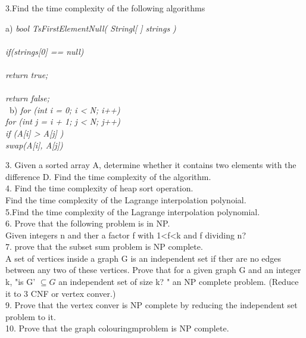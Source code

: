 \documentclass[a4paper]{article}
\begin{document}
\vspace{3mm}
\begin{flushleft}
3.Find the time complexity of the following algorithms\\
\end{flushleft}
a){ \em bool TsFirstElementNull( Stringl[ ]  strings )\\
{\\
if(strings[0] == null)\\
{\\
return true;\\
}\\
return false;\\
}}\
b) {\em for (int i = 0; i < N; i++)\\
for (int j = i + 1; j < N; j++)\\
if (A[i] > A[j] )\\
swap(A[i], A[j])}
\begin{flushleft}
3. Given a sorted array A, determine whether it contains two elements with the difference D. Find the time complexity of  the algorithm.\\

\vspace{3mm}
4. Find the time complexity of heap sort operation.\\
Find the time complexity of the Lagrange interpolation  polynoial.\\

\vspace{3mm}
5.Find the time complexity of the Lagrange interpolation polynomial.\\

\vspace{3mm}
6. Prove that the following problem is in NP.\\
Given integers n and ther a factor f with 1<f<k and f dividing n?\\

\vspace{3mm}
7. prove that the subset sum problem is NP complete.\\

\vspace{3mm}
A set of vertices inside a graph G is an independent set if ther are no edges between any two of these vertices. Prove that for a given graph G and an integer k, "is  G' $ \subseteq G$ an independent set of size k? " an NP complete problem. (Reduce it to 3 CNF or vertex conver.)\\

\vspace{3mm}
9. Prove that the vertex conver is NP complete by reducing the independent set problem to it.\\

\vspace{3mm}
10. Prove that the graph colouringmproblem is NP complete.\\
\end{flushleft}
\end{document}
